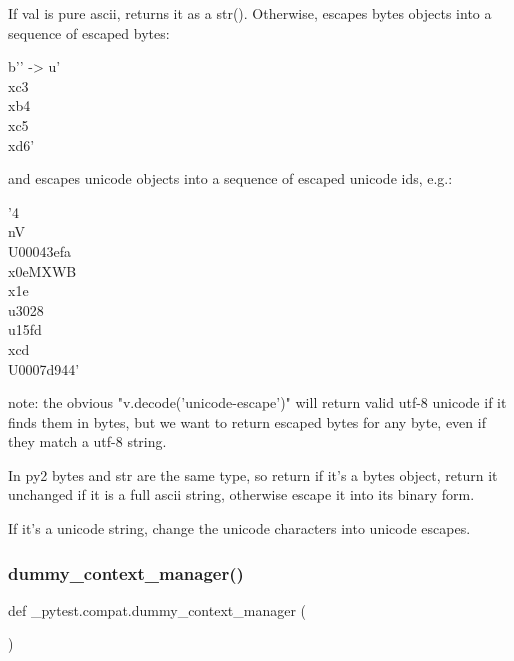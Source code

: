 \begin{DoxyVerb}If val is pure ascii, returns it as a str().  Otherwise, escapes
bytes objects into a sequence of escaped bytes:

b'' -> u'\\xc3\\xb4\\xc5\\xd6'

and escapes unicode objects into a sequence of escaped unicode
ids, e.g.:

'4\\nV\\U00043efa\\x0eMXWB\\x1e\\u3028\\u15fd\\xcd\\U0007d944'

note:
   the obvious "v.decode('unicode-escape')" will return
   valid utf-8 unicode if it finds them in bytes, but we
   want to return escaped bytes for any byte, even if they match
   a utf-8 string.\end{DoxyVerb}


\begin{DoxyVerb}In py2 bytes and str are the same type, so return if it's a bytes
object, return it unchanged if it is a full ascii string,
otherwise escape it into its binary form.

If it's a unicode string, change the unicode characters into
unicode escapes.\end{DoxyVerb}
 \mbox{\label{namespace__pytest_1_1compat_a3da3606628ba324edad1892c335aaa22}} 
\subsubsection{\texorpdfstring{dummy\+\_\+context\+\_\+manager()}{dummy\_context\_manager()}}
{\footnotesize\ttfamily def \+\_\+pytest.\+compat.\+dummy\+\_\+context\+\_\+manager (\begin{DoxyParamCaption}{ }\end{DoxyParamCaption})}

